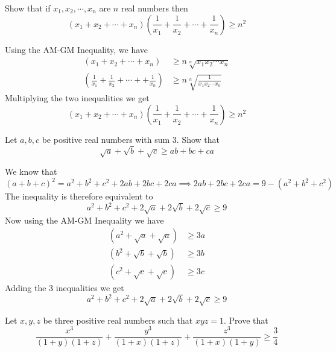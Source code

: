\begin{problem}
    Show that if $x_{1}, x_{2},\cdots, x_{n}$ are $n$ real numbers then
    \[
        (x_{1} + x_{2} + \cdots + x_{n})
        \left(\frac{1}{x_{1}} + \frac{1}{x_{2}} + \cdots + \frac{1}{x_{n}}\right) \geq n^{2}
    \]
\end{problem}
\begin{sol}
    Using the AM-GM Inequality, we have
    \begin{align*}
        (x_{1} + x_{2} + \cdots + x_{n}) &\geq n\sqrt[n]{x_{1} x_{2} \cdots x_{n}} \\
        \left(\frac{1}{x_{1}} + \frac{1}{x_{2}} + \cdots ++ \frac{1}{x_{n}}\right) &\geq 
        n\sqrt[n]{\frac{1}{x_{1}x_{2}\cdots x_{n}}}
    \end{align*}
    Multiplying the two inequalities we get
    \[
        (x_{1} + x_{2} + \cdots + x_{n})
        \left(\frac{1}{x_{1}} + \frac{1}{x_{2}} + \cdots + \frac{1}{x_{n}}\right) \geq n^{2}
    \]
\end{sol}

\begin{problem}[Russia MO 2004]
    Let $a,b,c$ be positive real numbers with sum 3. Show that 
    \[
        \sqrt{a} + \sqrt{b} + \sqrt{c} \geq ab + bc + ca
    \]
\end{problem}
\begin{sol}
    We know that
    \[
        (a+ b+ c)^{2} = a^{2} + b^{2} + c^{2} + 2ab + 2bc + 2ca \implies 
        2ab + 2bc + 2ca = 9 - (a^{2} + b^{2} + c^{2})
    \]
    The inequality is therefore equivalent to 
    \[
        a^{2} + b^{2} + c^{2} + 2\sqrt{a} + 2\sqrt{b} + 2\sqrt{c} \geq 9
    \]
    Now using the AM-GM Inequality we have
    \begin{align*}
        (a^{2} + \sqrt{a} + \sqrt{a}) &\geq 3a \\
        (b^{2} + \sqrt{b} + \sqrt{b}) &\geq 3b \\
        (c^{2} + \sqrt{c} + \sqrt{c}) &\geq 3c
    \end{align*}
    Adding the 3 inequalities we get 
    \[
        a^{2} + b^{2} + c^{2} + 2\sqrt{a} + 2\sqrt{b} + 2\sqrt{c} \geq 9
    \]
\end{sol}

\begin{problem}
    Let $x,y,z$ be three positive real numbers such that $xyz = 1$. Prove that 
    \[
        \frac{x^{3}}{(1+y)(1+z)} + \frac{y^{3}}{(1+x)(1+z)} + \frac{z^{3}}{(1+x)(1+y)} \geq \frac{3}{4}
    \]
\end{problem}
